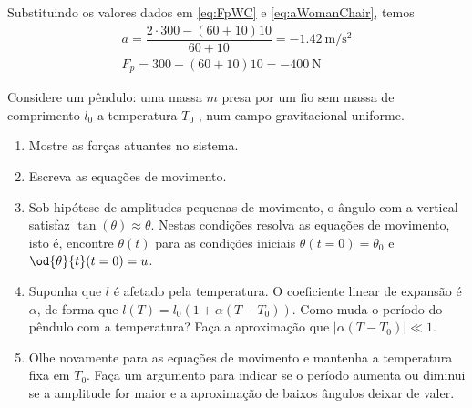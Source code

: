 \documentclass[]{IMTexam}
\begin{document}
\begin{questions}
\begin{solution}
\begin{multi}
		\end{multi}



		Substituindo os valores dados em \ref{eq:FpWC} e \ref{eq:aWomanChair}, temos
		\begin{gather*}
			a=\dfrac{2\cdot300-(60+10)10}{60+10}=-\SI{1.42}{\meter\per\second\squared}\\
			F_p=300-(60+10)10=-\SI{400}{\newton}
		\end{gather*}
	\end{solution}



	\question Considere um pêndulo: uma massa $ m $ presa por um fio sem massa de
	comprimento $ l_0 $ a temperatura $ T_0 $ , num campo gravitacional uniforme.

	\begin{enumerate}[label=\arabic*.]
		\item Mostre as forças atuantes no sistema.
		\item Escreva as equações de movimento.
		\item Sob hipótese de amplitudes pequenas de movimento, o ângulo com a vertical satisfaz $ \tan(\theta) \approx \theta $. Nestas condições resolva as equações de movimento, isto é, encontre $\theta(t)$ para as condições iniciais $ \theta(t = 0) = \theta_0 $ e $ \od{\theta}{t}(t=0)=u $.
		\item  Suponha que $ l $ é afetado pela temperatura. O coeficiente linear de 	expansão é $ \alpha $, de forma que $ l(T) = l_0(1+\alpha(T −T_0)) $. Como muda 	o período do pêndulo com a temperatura? Faça a aproximação 	que $ |\alpha(T − T_0)| \ll 1 $.
		\item Olhe novamente para as equações de movimento e mantenha a temperatura fixa em $ T_0 $. Faça um argumento para indicar se o período aumenta ou diminui se a amplitude for maior e a aproximação de baixos ângulos deixar de valer.
	\end{enumerate}


\end{questions}
\end{document}
